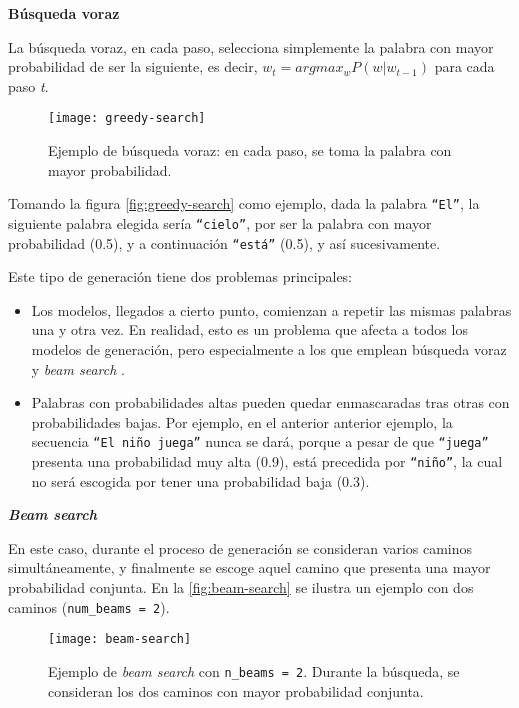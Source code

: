 \bigskip
\noindent
\textbf{Búsqueda voraz}

La búsqueda voraz, en cada paso, selecciona simplemente la palabra con mayor probabilidad de ser la siguiente, es decir, $ w_t = argmax_w P(w|w_{t-1}) $ para cada paso \emph{t}.

\begin{figure}[h]
	\centering
	\texttt{[image: greedy-search]}
	\caption[Ejemplo de generación con búsqueda voraz.]{Ejemplo de búsqueda voraz: en cada paso, se toma la palabra con mayor probabilidad.}
	\label{fig:greedy-search}
\end{figure}


Tomando la figura \autoref{fig:greedy-search} como ejemplo, dada la palabra \texttt{``El''}, la siguiente palabra elegida sería \texttt{``cielo''}, por ser la palabra con mayor probabilidad (0.5), y a continuación \texttt{``está''} (0.5), y así sucesivamente.

Este tipo de generación tiene dos problemas principales:

\begin{itemize}
	\item [\textbullet] Los modelos, llegados a cierto punto, comienzan a repetir las mismas palabras una y otra vez. En realidad, esto es un problema que afecta a todos los modelos de generación, pero especialmente a los que emplean búsqueda voraz y \emph{beam search} \cite{vijayakumar16, shao17}.
	\item [\textbullet] Palabras con probabilidades altas pueden quedar enmascaradas tras otras con probabilidades bajas. Por ejemplo, en el anterior anterior ejemplo, la secuencia \texttt{``El niño juega''} nunca se dará, porque a pesar de que \texttt{``juega''} presenta una probabilidad muy alta (0.9), está precedida por \texttt{``niño''}, la cual no será escogida por tener una probabilidad baja (0.3).
\end{itemize}


\bigskip
\noindent
\textbf{\emph{Beam search}}

En este caso, durante el proceso de generación se consideran varios caminos simultáneamente, y finalmente se escoge aquel camino que presenta una mayor probabilidad conjunta. En la \autoref{fig:beam-search} se ilustra un ejemplo con dos caminos (\texttt{num\_beams = 2}).

\begin{figure}[!h]
	\centering
	\texttt{[image: beam-search]}
	\caption[Ejemplo de generación con búsqueda \emph{beam-search}.]{Ejemplo de \emph{beam search} con \texttt{n\_beams = 2}. Durante la búsqueda, se consideran los dos caminos con mayor probabilidad conjunta.}
	\label{fig:beam-search}
\end{figure}

